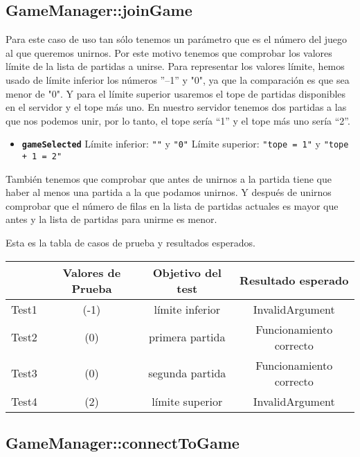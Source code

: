 \subsection{GameManager::joinGame}

Para este caso de uso tan sólo tenemos un parámetro que es el número del juego al que queremos unirnos. Por este motivo tenemos que comprobar los valores límite de la lista de partidas a unirse. Para representar los valores límite, hemos usado de límite inferior los números ''--1'' y "0", ya que la comparación es que sea menor de "0". Y para el límite superior usaremos el tope de partidas disponibles en el servidor y el tope más uno. En nuestro servidor tenemos dos partidas a las que nos podemos unir, por lo tanto, el tope sería ``1'' y el tope más uno sería ``2''. 

\begin{itemize}
\item \textbf{\texttt{gameSelected}}
\subitem Límite inferior: \texttt{""} y \texttt{"0"}
\subitem Límite superior: \texttt{"tope = 1"} y \texttt{"tope + 1 = 2"}
\end{itemize}

También tenemos que comprobar que antes de unirnos a la partida tiene que haber al menos una partida a la que podamos unirnos. Y después de unirnos comprobar que el número de filas en la lista de partidas actuales es mayor que antes y la lista de partidas para unirme es menor.

Esta es la tabla de casos de prueba y resultados esperados.

{\footnotesize
\begin{longtable}[c]{lccc}
 & \textbf{Valores de Prueba} & \textbf{Objetivo del test} & \textbf{Resultado esperado} \\
\hline \hline
\endhead

Test1 & (-1) & límite inferior & InvalidArgument\\
Test2 & (0) & primera partida & Funcionamiento correcto\\
Test3 & (0) & segunda partida & Funcionamiento correcto\\
Test4 & (2) & límite superior & InvalidArgument\\

\hline
\end{longtable}
}

\subsection{GameManager::connectToGame}

